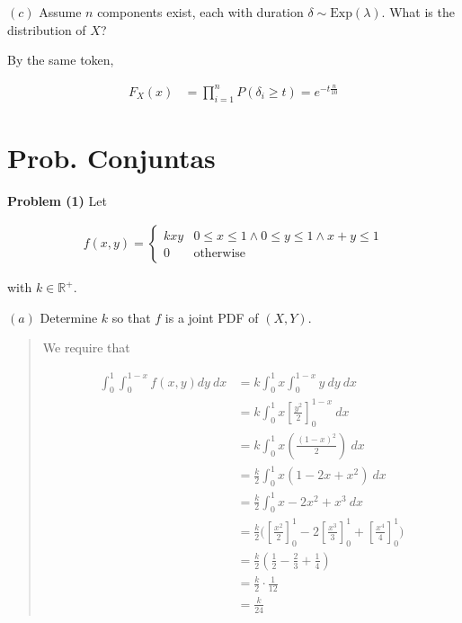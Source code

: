 \documentclass[a4paper, 12pt]{article}
\begin{document}
$(c)$ Assume $n$ components exist, each with duration $\delta \sim \text{Exp}(\lambda)$. What is the distribution of $X$?


By the same token, 

\begin{align*}
    F_X(x) &= \prod^{n}_{i=1} P(\delta_i \geq t) = e^{-t \frac{n}{10}}
\end{align*}

\pagebreak 

\section{Prob. Conjuntas}

\textbf{Problem (1)} Let 

\begin{align*}
    f(x, y) = \begin{cases}
        kxy & 0 \leq x \leq 1 \land  0 \leq y \leq 1 \land  x + y \leq 1 \\ 
        0 &\text{otherwise}
    \end{cases}
\end{align*}

with $k \in \mathbb{R}^{+}$. 

$(a)$ Determine $k$ so that $f$ is a joint PDF of $( X, Y )$.


\small
\begin{quote}

We require that 

\begin{align*}
    \int_{0}^{1} \int_{0}^{1-x} f(x, y) dy ~ dx &= k \int_0^1 x \int_0^{1-x} y ~ dy ~ dx \\ 
                                                &= k \int_0^1 x \left[ \frac{y^2}{2} \right]^{1-x}_0 ~ dx \\ 
                                                &= k \int _0^1 x \left( \frac{( 1-x )^2}{2} \right)  ~ dx \\ 
                                                &= \frac{k}{2} \int_0^1 x\left( 1 -2x + x^2 \right)  ~ dx \\ 
                                                &= \frac{k}{2} \int_0^1 x - 2x^2 +x^3 ~ dx \\ 
                                                &= \frac{k}{2} \Big( \left[ \frac{x^2}{2} \right]_0^{1} - 2 \left[ \frac{x^3}{3} \right]_0^1 + \left[ \frac{x^4}{4} \right]_0^1   \Big) \\ 
                                                &=\frac{k}{2} \left( \frac{1}{2} - \frac{2}{3} + \frac{1}{4} \right)  \\ 
                                                &=\frac{k}{2} \cdot \frac{1}{12} \\ 
                                                &= \frac{k}{24}
\end{align*}

\end{quote}
\normalsize
\end{document}
